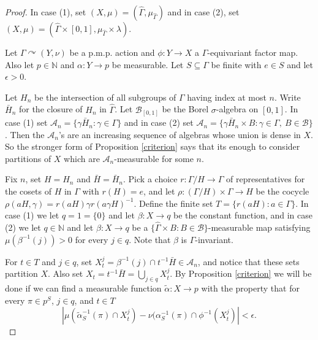 \documentclass[12pt]{amsart}
\theoremstyle{definition}
\def\cal{\mathcal}
\newcommand\bN{{\mathbb N}}
\newcommand{\pmp}{p{$.$}m{$.$}p{$.$}}
\newcommand{\acts}{\curvearrowright}
\begin{document}
\begin{proof}
	In case (1), set $(X, \mu) = (\hat{\Gamma}, \mu_{\hat{\Gamma}})$ and in case (2), set $(X, \mu) = (\hat{\Gamma} \times [0, 1], \mu_{\hat{\Gamma}} \times \lambda)$.

    Let $\Gamma \acts (Y, \nu)$ be a {\pmp} action and $\phi : Y \rightarrow X$ a $\Gamma$-equivariant factor map. Also let $p \in \bN$ and $\alpha : Y \rightarrow p$ be measurable. Let $S \subseteq \Gamma$ be finite with $e \in S$ and let $\epsilon > 0$.

    Let $H_n$ be the intersection of all subgroups of $\Gamma$ having index at most $n$. Write $\bar{H}_n$ for the closure of $H_n$ in $\hat{\Gamma}$. Let $\cal B_{[0,1]}$ be the Borel $\sigma$-algebra on $[0,1]$. In case (1) set $\cal A_n = \{\gamma \bar{H}_n : \gamma \in \Gamma\}$ and in case (2) set $\cal A_n = \{\gamma \bar{H}_n \times B : \gamma \in \Gamma, \ B \in \cal B\}$. Then the $\cal A_n$'s are an increasing sequence of algebras whose union is dense in $X$. So the stronger form of Proposition \ref{criterion} says that its enough to consider partitions of $X$ which are $\cal A_n$-measurable for some $n$.

    Fix $n$, set $H = H_n$ and $\bar{H} = \bar{H}_n$. Pick a choice $r : \Gamma / H \rightarrow \Gamma$ of representatives for the cosets of $H$ in $\Gamma$ with $r(H) = e$, and let $\rho : (\Gamma / H) \times \Gamma \rightarrow H$ be the cocycle $\rho(a H, \gamma) = r(a H) \gamma r(a \gamma H)^{-1}$. Define the finite set $T = \{r(a H) : a \in \Gamma\}$. In case (1) we let $q = 1 = \{0\}$ and let $\beta : X \rightarrow q$ be the constant function, and in case (2) we let $q \in \bN$ and let $\beta : X \rightarrow q$ be a $\{\hat{\Gamma} \times B : B \in \cal B\}$-measurable map satisfying $\mu(\beta^{-1}(j)) > 0$ for every $j \in q$. Note that $\beta$ is $\Gamma$-invariant.

    For $t \in T$ and $j \in q$, set $X_t^j = \beta^{-1}(j) \cap t^{-1} \bar{H} \in \cal A_n$, and notice that these sets partition $X$. Also set $X_t = t^{-1} \bar{H} = \bigcup_{j \in q} X_t^j$. By Proposition \ref{criterion} we will be done if we can find a measurable function $\tilde{\alpha} : X \rightarrow p$ with the property that for every $\pi \in p^S$, $j \in q$, and $t \in T$
	$$\left| \mu(\tilde{\alpha}_S^{-1}(\pi) \cap X_t^j) - \nu(\alpha_S^{-1}(\pi) \cap \phi^{-1}(X_t^j) \right| < \epsilon.$$
	

\end{proof}
\end{document}
